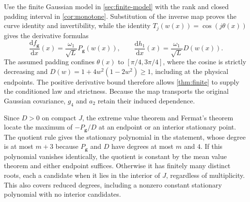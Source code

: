 \begin{proofEnd}
Use the finite Gaussian model in \cref{sec:finite-model} with the rank and closed padding interval in
\cref{cor:monotone}. Substitution of the inverse map proves the curve
identity and invertibility, while the identity
$T_j(w(x))=\cos(j\theta(x))$ gives the derivative formulas
\[
 \frac{\mathrm{d}f_{\boldsymbol g}}{\mathrm{d}x}(x)=\frac{\omega_1}{\sqrt L}P_{\boldsymbol g}(w(x)),
 \qquad \frac{\mathrm{d}h_1}{\mathrm{d}x}(x)=\frac{\omega_1}{\sqrt L}D(w(x)).
\]
The assumed padding confines $\theta(x)$ to $[\pi/4,3\pi/4]$, where
the cosine is strictly decreasing and
$D(w)=1+4w^2(1-2w^2)\geq1$, including at the physical endpoints.
The positive derivative bound therefore allows \cref{thm:finite}
to supply the conditioned law and strictness.
Because the map transports the original Gaussian covariance,
$g_4$ and $a_2$ retain their induced dependence.

Since $D>0$ on compact $J$, the extreme value theorem and Fermat's
theorem locate the maximum of $-P_{\boldsymbol g}/D$ at an endpoint
or an interior stationary point. The quotient rule gives the
stationary polynomial in the statement, whose degree is at most
$m+3$ because $P_{\boldsymbol g}$ and $D$ have degrees at most
$m$ and $4$. If this polynomial vanishes identically, the quotient
is constant by the mean value theorem and either endpoint suffices.
Otherwise it has finitely many distinct roots, each a candidate
when it lies in the interior of $J$, regardless of multiplicity.
This also covers reduced degrees, including a nonzero constant
stationary polynomial with no interior candidates.
\end{proofEnd}

